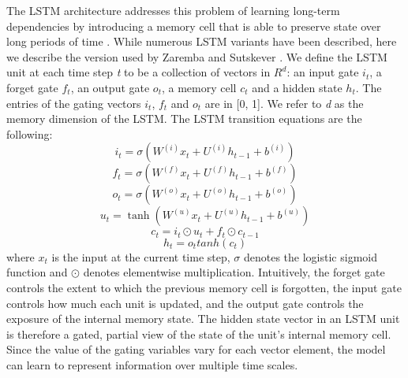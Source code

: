 \documentclass[letterpaper]{article}
\begin{document}
The LSTM architecture addresses this problem of learning long-term dependencies by introducing a memory cell that is able to preserve state over long periods of time \cite{Hochreiter:1997:LSM:1246443.1246450}. While numerous LSTM variants have been described, here we describe the version used by Zaremba and Sutskever . We define the LSTM unit at each time step \textit{t} to be a collection of vectors in \textbf{$R^{d}$}: an input gate \textit{$i_{t}$}, a forget gate \textit{$f_{t}$}, an output gate \textit{$o_{t}$}, a memory cell \textit{$c_{t}$} and a hidden state \textit{$h_{t}$}. The entries of the gating vectors \textit{$i_{t}$}, \textit{$f_{t}$} and \textit{$o_{t}$} are in [0, 1]. We refer to \textit{d} as the memory dimension of the LSTM. The LSTM transition equations are the following:
\begin{equation}\label{lstm-i}
i_{t} = \sigma(W^{(i)}x_{t}+U^{(i)}h_{t-1}+b^{(i)})
\end{equation}
\begin{equation}\label{lstm-f}
f_{t} = \sigma(W^{(f)}x_{t}+U^{(f)}h_{t-1}+b^{(f)})
\end{equation}
\begin{equation}\label{lstm-o}
o_{t} = \sigma(W^{(o)}x_{t}+U^{(o)}h_{t-1}+b^{(o)})
\end{equation}
\begin{equation}\label{lstm-u}
u_{t} = \tanh(W^{(u)}x_{t}+U^{(u)}h_{t-1}+b^{(u)})
\end{equation}
\begin{equation}\label{lstm-c}
c_{t} = i_{t} \odot u_{t} + f_{t} \odot c_{t-1}
\end{equation}
\begin{equation}\label{lstm-h}
h_{t} = o_{t} tanh(c_{t})
\end{equation}
where \textit{$x_{t}$} is the input at the current time step, $\sigma$ denotes the logistic sigmoid function and $\odot$ denotes elementwise multiplication. Intuitively, the forget gate controls the extent to which the previous memory cell is forgotten, the input gate controls how much each unit is updated, and the output gate controls the exposure of the internal memory state. The hidden state vector in an LSTM unit is therefore a gated, partial view of the state of the unit's internal memory cell. Since the value of the gating variables vary for each vector element, the model can learn to represent information over multiple time scales.
\end{document}
